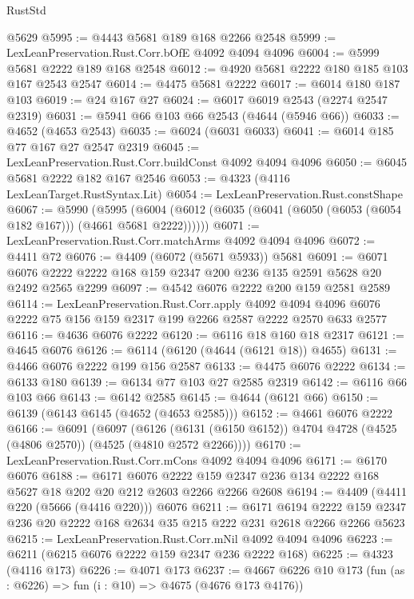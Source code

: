 \begin{lexlean}{RustStd}
\begin{coremodule}
    @5629
@5995 := @4443 @5681 @189 @168 @2266 @2548
@5999 := LexLeanPreservation.Rust.Corr.bOfE @4092 @4094 @4096
@6004 := @5999 @5681 @2222 @189 @168 @2548
@6012 := @4920 @5681 @2222 @180 @185 @103 @167 @2543 @2547
@6014 := @4475 @5681 @2222
@6017 := @6014 @180 @187 @103
@6019 := @24 @167 @27
@6024 := @6017 @6019 @2543 (@2274 @2547 @2319)
@6031 := @5941 @66 @103 @66 @2543 (@4644 (@5946 @66))
@6033 := @4652 (@4653 @2543)
@6035 := @6024 (@6031 @6033)
@6041 := @6014 @185 @77 @167 @27 @2547 @2319
@6045 := LexLeanPreservation.Rust.Corr.buildConst @4092 @4094 @4096
@6050 := @6045 @5681 @2222 @182 @167 @2546
@6053 := @4323 (@4116 LexLeanTarget.RustSyntax.Lit)
@6054 := LexLeanPreservation.Rust.constShape
@6067 := @5990
    (@5995 (@6004 (@6012 (@6035 (@6041 (@6050 (@6053 (@6054 @182 @167))) (@4661 @5681 @2222))))))
@6071 := LexLeanPreservation.Rust.Corr.matchArms @4092 @4094 @4096
@6072 := @4411 @72
@6076 := @4409 (@6072 (@5671 @5933)) @5681
@6091 := @6071 @6076 @2222 @2222 @168 @159 @2347 @200 @236 @135 @2591 @5628 @20 @2492 @2565 @2299
@6097 := @4542 @6076 @2222 @200 @159 @2581 @2589
@6114 := LexLeanPreservation.Rust.Corr.apply
    @4092
    @4094
    @4096
    @6076
    @2222
    @75
    @156
    @159
    @2317
    @199
    @2266
    @2587
    @2222
    @2570
    @633
    @2577
@6116 := @4636 @6076 @2222
@6120 := @6116 @18 @160 @18 @2317
@6121 := @4645 @6076
@6126 := @6114 (@6120 (@4644 (@6121 @18)) @4655)
@6131 := @4466 @6076 @2222 @199 @156 @2587
@6133 := @4475 @6076 @2222
@6134 := @6133 @180
@6139 := @6134 @77 @103 @27 @2585 @2319
@6142 := @6116 @66 @103 @66
@6143 := @6142 @2585
@6145 := @4644 (@6121 @66)
@6150 := @6139 (@6143 @6145 (@4652 (@4653 @2585)))
@6152 := @4661 @6076 @2222
@6166 := @6091
    (@6097
      (@6126 (@6131 (@6150 @6152)) @4704 @4728 (@4525 (@4806 @2570)) (@4525 (@4810 @2572 @2266))))
@6170 := LexLeanPreservation.Rust.Corr.mCons @4092 @4094 @4096
@6171 := @6170 @6076
@6188 := @6171
    @6076
    @2222
    @159
    @2347
    @236
    @134
    @2222
    @168
    @5627
    @18
    @202
    @20
    @212
    @2603
    @2266
    @2266
    @2608
@6194 := @4409 (@4411 @220 (@5666 (@4416 @220))) @6076
@6211 := @6171
    @6194
    @2222
    @159
    @2347
    @236
    @20
    @2222
    @168
    @2634
    @35
    @215
    @222
    @231
    @2618
    @2266
    @2266
    @5623
@6215 := LexLeanPreservation.Rust.Corr.mNil @4092 @4094 @4096
@6223 := @6211 (@6215 @6076 @2222 @159 @2347 @236 @2222 @168)
@6225 := @4323 (@4116 @173)
@6226 := @4071 @173
@6237 := @4667
    @6226
    @10
    @173
    (fun (as : @6226) => fun (i : @10) => @4675 (@4676 @173 @4176))

\end{coremodule}
\end{lexlean}
